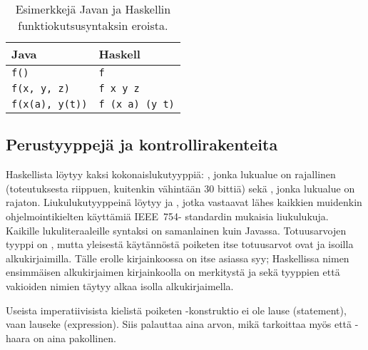 \begin{table}
    \begin{tabular}[H]{l|l}
        Java                    &   Haskell         \\
        \hline
        \texttt{f()}            &   \texttt{f}              \\
        \texttt{f(x, y, z)}     &   \texttt{f x y z}        \\
        \texttt{f(x(a), y(t))}  &   \texttt{f (x a) (y t)}  \\
    \end{tabular}
    \label{tbl:function-call-examples}
    \caption{Esimerkkejä Javan ja Haskellin funktiokutsusyntaksin eroista.}
\end{table}

\subsection{Perustyyppejä ja kontrollirakenteita}
Haskellista löytyy kaksi kokonaislukutyyppiä: ,
jonka lukualue on rajallinen (toteutuksesta riippuen, kuitenkin vähintään 30 bittiä)
sekä ,
jonka lukualue on rajaton.
Liukulukutyyppeinä löytyy  ja ,
jotka vastaavat lähes kaikkien muidenkin ohjelmointikielten käyttämiä IEEE~754- standardin mukaisia liukulukuja.
Kaikille lukuliteraaleille syntaksi on samanlainen kuin Javassa.
Totuusarvojen tyyppi on ,
mutta yleisestä käytännöstä poiketen itse totuusarvot ovat  ja  isoilla alkukirjaimilla.
Tälle erolle kirjainkoossa on itse asiassa syy; Haskellissa nimen ensimmäisen alkukirjaimen kirjainkoolla on merkitystä
ja sekä tyyppien että vakioiden nimien täytyy alkaa isolla alkukirjaimella.

Useista imperatiivisista kielistä poiketen -konstruktio ei ole lause (statement),
vaan lauseke (expression).
Siis  palauttaa aina arvon, mikä tarkoittaa myös että -haara on aina pakollinen.

